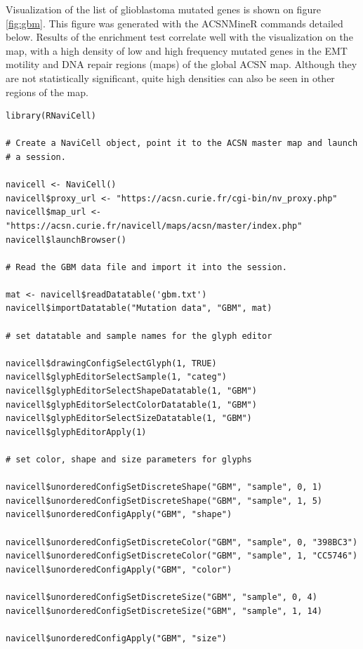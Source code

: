 \documentclass[article]{jss}
\begin{document}
Visualization of the list of glioblastoma mutated genes is shown on figure
\ref{fig:gbm}. This figure was generated with the ACSNMineR commands detailed
below. Results of the enrichment test correlate well with the visualization on
the map, with a high density of low and high frequency mutated genes in the EMT
motility and DNA repair regions (maps) of the global ACSN map. Although they
are not statistically significant, quite high densities can also be seen in
other regions of the map.

\begin{verbatim}
library(RNaviCell)

# Create a NaviCell object, point it to the ACSN master map and launch
# a session.

navicell <- NaviCell()
navicell$proxy_url <- "https://acsn.curie.fr/cgi-bin/nv_proxy.php"
navicell$map_url <- "https://acsn.curie.fr/navicell/maps/acsn/master/index.php"
navicell$launchBrowser()

# Read the GBM data file and import it into the session.

mat <- navicell$readDatatable('gbm.txt')
navicell$importDatatable("Mutation data", "GBM", mat)

# set datatable and sample names for the glyph editor

navicell$drawingConfigSelectGlyph(1, TRUE)
navicell$glyphEditorSelectSample(1, "categ")
navicell$glyphEditorSelectShapeDatatable(1, "GBM")
navicell$glyphEditorSelectColorDatatable(1, "GBM")
navicell$glyphEditorSelectSizeDatatable(1, "GBM")
navicell$glyphEditorApply(1)

# set color, shape and size parameters for glyphs

navicell$unorderedConfigSetDiscreteShape("GBM", "sample", 0, 1)
navicell$unorderedConfigSetDiscreteShape("GBM", "sample", 1, 5)
navicell$unorderedConfigApply("GBM", "shape")

navicell$unorderedConfigSetDiscreteColor("GBM", "sample", 0, "398BC3")
navicell$unorderedConfigSetDiscreteColor("GBM", "sample", 1, "CC5746")
navicell$unorderedConfigApply("GBM", "color")

navicell$unorderedConfigSetDiscreteSize("GBM", "sample", 0, 4)
navicell$unorderedConfigSetDiscreteSize("GBM", "sample", 1, 14)

navicell$unorderedConfigApply("GBM", "size")
\end{verbatim}
\end{document}
